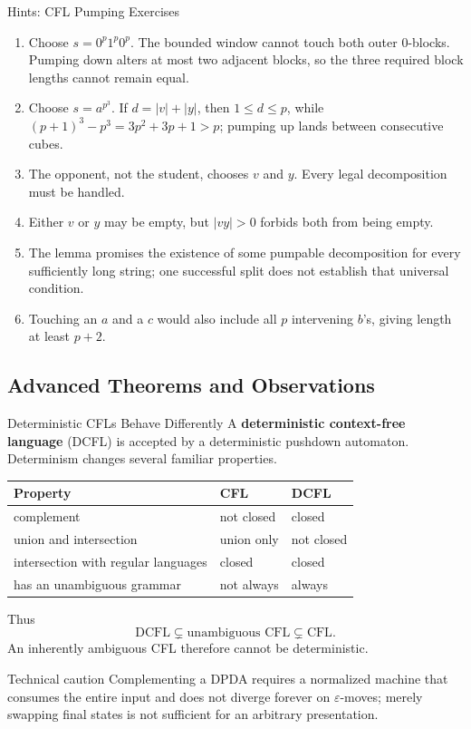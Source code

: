\documentclass[10pt]{beamer}
\begin{document}
\begin{frame}{Hints: CFL Pumping Exercises}
  \small
  \begin{enumerate}
    \item Choose $s=0^p1^p0^p$. The bounded window cannot touch both outer
      $0$-blocks. Pumping down alters at most two adjacent blocks, so the three
      required block lengths cannot remain equal.
    \item Choose $s=a^{p^3}$. If $d=|v|+|y|$, then $1\le d\le p$, while
      $(p+1)^3-p^3=3p^2+3p+1>p$; pumping up lands between consecutive cubes.
    \item The opponent, not the student, chooses $v$ and $y$. Every legal decomposition must be handled.
    \item Either $v$ or $y$ may be empty, but $|vy|>0$ forbids both from being empty.
    \item The lemma promises the existence of some pumpable decomposition for every sufficiently long
      string; one successful split does not establish that universal condition.
    \item Touching an $a$ and a $c$ would also include all $p$ intervening $b$'s, giving length at least $p+2$.
  \end{enumerate}
\end{frame}

\subsection{Advanced Theorems and Observations}

\begin{frame}{Deterministic CFLs Behave Differently}
  \small
  A \textbf{deterministic context-free language} (DCFL) is accepted by a
  deterministic pushdown automaton. Determinism changes several familiar
  properties.
  \pause
  \begin{center}
  \begin{tabular}{L{4.0cm}L{2.5cm}L{2.5cm}}
    \toprule
    Property & CFL & DCFL \\
    \midrule
    complement & not closed & closed \\
    union and intersection & union only & not closed \\
    intersection with regular languages & closed & closed \\
    has an unambiguous grammar & not always & always \\
    \bottomrule
  \end{tabular}
  \end{center}
  \pause
  Thus
  \[
    \text{DCFL}\subsetneq\text{unambiguous CFL}
      \subsetneq\text{CFL}.
  \]
  An inherently ambiguous CFL therefore cannot be deterministic.
  \begin{alertblock}{Technical caution}
    Complementing a DPDA requires a normalized machine that consumes the
    entire input and does not diverge forever on $\varepsilon$-moves; merely
    swapping final states is not sufficient for an arbitrary presentation.
  \end{alertblock}
\end{frame}
\end{document}
